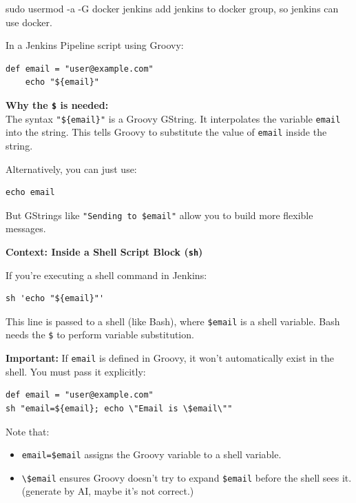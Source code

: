 \documentclass[paper=8.5in:11in, twoside, 12pt, pagesize=pdftex]{book}
\begin{document}
sudo usermod -a -G docker jenkins add jenkins to docker group, so jenkins can use docker. 

In a Jenkins Pipeline script using Groovy:

\begin{lstlisting}[basicstyle=\ttfamily, frame=single]
	def email = "user@example.com"
	echo "${email}"
\end{lstlisting}

\textbf{Why the \texttt{\$} is needed:} \\
The syntax \texttt{"\$\{email\}"} is a Groovy GString. It interpolates the variable \texttt{email} into the string. This tells Groovy to substitute the value of \texttt{email} inside the string.

Alternatively, you can just use:

\begin{lstlisting}[]
	echo email
\end{lstlisting}

But GStrings like \texttt{"Sending to \${email}"} allow you to build more flexible messages.

\textbf{Context: Inside a Shell Script Block (\texttt{sh})}

If you're executing a shell command in Jenkins:

\begin{lstlisting}[]
	sh 'echo "${email}"'
\end{lstlisting}

This line is passed to a shell (like Bash), where \texttt{\$email} is a shell variable. Bash needs the \texttt{\$} to perform variable substitution.

\textbf{Important:} If \texttt{email} is defined in Groovy, it won't automatically exist in the shell. You must pass it explicitly:

\begin{lstlisting}[]
def email = "user@example.com"
sh "email=${email}; echo \"Email is \$email\""
\end{lstlisting}

Note that:
\begin{itemize}
	\item \texttt{email=\${email}} assigns the Groovy variable to a shell variable.
	
	\item \texttt{\textbackslash\$email} ensures Groovy doesn't try to expand \texttt{\$email} before the shell sees it. (generate by AI, maybe it's not correct.)
\end{itemize}
\end{document}
